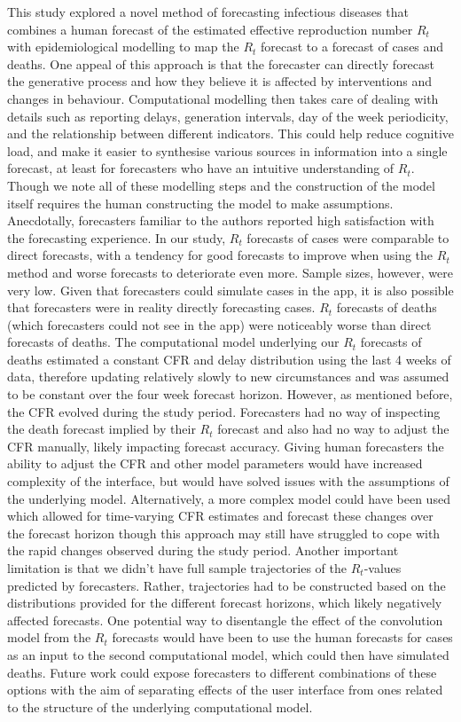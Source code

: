 \documentclass[10pt,a4paper,twocolumn]{article}
\begin{document}
This study explored a novel method of forecasting infectious diseases that combines a human forecast of the estimated effective reproduction number $R_t$ with epidemiological modelling to map the $R_t$ forecast to a forecast of cases and deaths. One appeal of this approach is that the forecaster can directly forecast the generative process and how they believe it is affected by interventions and changes in behaviour. Computational modelling then takes care of dealing with details such as reporting delays, generation intervals, day of the week periodicity, and the relationship between different indicators. This could help reduce cognitive load, and make it easier to synthesise various sources in information into a single forecast, at least for forecasters who have an intuitive understanding of $R_t$. Though we note all of these modelling steps and the construction of the model itself requires the human constructing the model to make assumptions. Anecdotally, forecasters familiar to the authors reported high satisfaction with the forecasting experience. In our study, $R_t$ forecasts of cases were comparable to direct forecasts, with a tendency for good forecasts to improve when using the $R_t$ method and worse forecasts to deteriorate even more. Sample sizes, however, were very low. 
Given that forecasters could simulate cases in the app, it is also possible that forecasters were in reality directly forecasting cases. 
$R_t$ forecasts of deaths (which forecasters could not see in the app) were noticeably worse than direct forecasts of deaths. The computational model underlying our $R_t$ forecasts of deaths estimated a constant CFR and delay distribution using the last 4 weeks of data, therefore updating relatively slowly to new circumstances and was assumed to be constant over the four week forecast horizon. However, as mentioned before, the CFR evolved during the study period. Forecasters had no way of inspecting the death forecast implied by their $R_t$ forecast and also had no way to adjust the CFR manually, likely impacting forecast accuracy. Giving human forecasters the ability to adjust the CFR and other model parameters would have increased complexity of the interface, but would have solved issues with the assumptions of the underlying model. Alternatively, a more complex model could have been used which allowed for time-varying CFR estimates and forecast these changes over the forecast horizon though this approach may still have struggled to cope with the rapid changes observed during the study period. Another important limitation is that we didn't have full sample trajectories of the $R_t$-values predicted by forecasters. Rather, trajectories had to be constructed based on the distributions provided for the different forecast horizons, which likely negatively affected forecasts. One potential way to disentangle the effect of the convolution model from the $R_t$ forecasts would have been to use the human forecasts for cases as an input to the second computational model, which could then have simulated deaths. Future work could expose forecasters to different combinations of these options with the aim of separating effects of the user interface from ones related to the structure of the underlying computational model.
\end{document}
